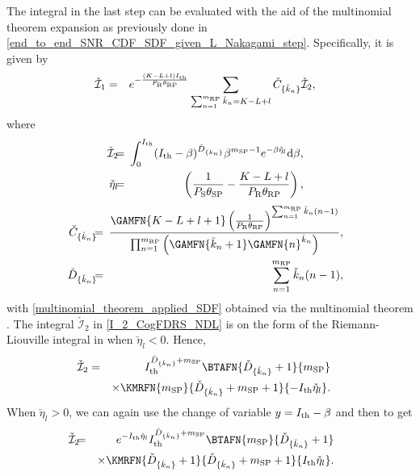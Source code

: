 \documentclass[10pt,journal]{IEEEtran}
\begin{document}
The integral in the last step can be evaluated with the aid of the multinomial theorem expansion as previously done in \eqref{end_to_end_SNR_CDF_SDF_given_L_Nakagami_step}. Specifically, it is given by
\begin{eqnarray}
\!\!\!\!\!\mathcal{\check{I}}_1
&=& e^{-\frac{(K-L+l)I_{\rm th}}{P_{{\rm R}}{\theta_{{\rm R} {\rm P}}}}} \sum_{\sum_{n=1}^{{m_{{\rm R} {\rm P}}}} \check{k}_{n} = K-L+l} \check{C}_{\{\check{k}_n\}} \mathcal{\check{I}}_2,\label{multinomial_theorem_applied_SDF}
\end{eqnarray}
where
\begin{eqnarray}
\!\!\!\!\!\mathcal{\check{I}}_2
\!\!\!&=&\!\!\!
\int_0^{\Ith} (\Ith-\beta)^{\check{D}_{\{\check{k}_n\}}}\beta^{\msp-1}e^{-\beta\check{\eta}_l} \mathrm{d}\beta,\label{I_2_CogFDRS_NDL}\\
\!\!\!\!\!\check{\eta}_l
\!\!\!&=&\!\!\!
\left(\frac{1}{\PS\thetasp}-\frac{K-L+l}{\PR\thetarp}\right),
\end{eqnarray}
\begin{eqnarray}
\!\!\!\!\!\check{C}_{\{\check{k}_n\}}\!\!\!&=&\!\!\!\frac{\GAMFN{K-L+l+1}\left(\frac{1}{\PR\thetarp}\right)^{\sum_{n=1}^{\mrp}\check{k}_n(n-1)}}{\prod_{n=1}^{\mrp}\left(\GAMFN{\check{k}_n+1}\GAMFN{n}^{\check{k}_n}\right)},\\
\!\!\!\!\!\check{D}_{\{\check{k}_n\}}\!\!\!&=&\!\!\!\sum_{n=1}^{\mrp}\check{k}_n(n-1),
\end{eqnarray}
with \eqref{multinomial_theorem_applied_SDF} obtained via the multinomial theorem \cite[Section 24.1.2]{abramowitz_stegun}. The integral $\mathcal{\check{I}}_2$ in \eqref{I_2_CogFDRS_NDL} is on the form of the Riemann-Liouville integral in \cite[Eq. 3.383-1]{gradshteyn_ryzhik} when $\check{\eta}_l <0$. Hence,
\begin{eqnarray}
\!\!\!\!\!\!\!\!\!\!\!\!\!\mathcal{\check{I}}_2
&=& \Ith^{\check{D}_{\{\check{k}_n\}}+\msp} \BTAFN{\check{D}_{\{\check{k}_n\}}+1}{\msp}
\nonumber\\&&\times
\KMRFN{\msp}{\check{D}_{\{\check{k}_n\}}+\msp+1}{-\Ith \check{\eta}_l}.
\end{eqnarray}
When $\check{\eta}_l > 0$, we can again use the change of variable $y=I_{\rm th}-\beta$ and then \cite[Eq. 3.383-1]{gradshteyn_ryzhik} to get
\begin{eqnarray}
\!\!\!\!\!\!\!\!\!\!\!\!\!\!\!\!\mathcal{\check{I}}_2
\!\!\!&=&\!\!\! e^{-\Ith \check{\eta}_l}\Ith^{\check{D}_{\{\check{k}_n\}}+\msp} \BTAFN{\msp}{\check{D}_{\{\check{k}_n\}}+1}
\nonumber\\\!\!\!\!\!\!&&\times
\KMRFN{\check{D}_{\{\check{k}_n\}}+1}{\check{D}_{\{\check{k}_n\}}+\msp+1}{\Ith \check{\eta}_l}.
\end{eqnarray}
\end{document}
